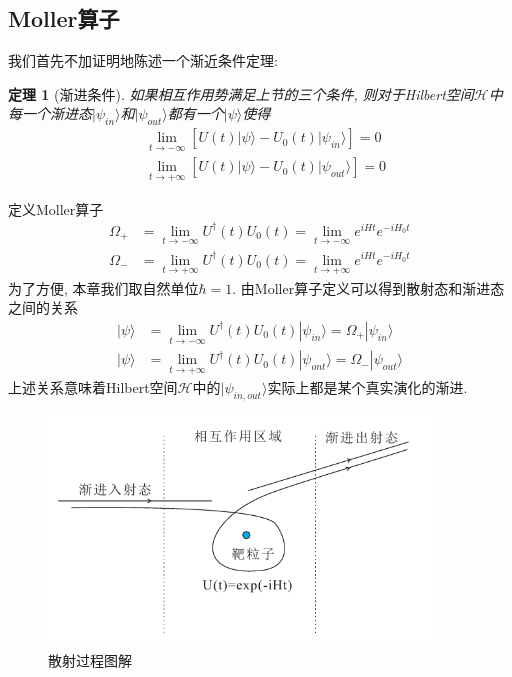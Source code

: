 \documentclass[a4paper,11pt]{book}
\newtheorem{theorem}{\hspace{2em}定理}[section]
\begin{document}
\subsection{Moller算子}
我们首先不加证明地陈述一个渐近条件定理:
\begin{theorem}[渐进条件]
  如果相互作用势满足上节的三个条件, 则对于Hilbert空间$\mathcal{H}$中每一个渐进态$|\psi_{in}\rangle$和$|\psi_{out}\rangle$都有一个$|\psi\rangle$使得
  \begin{equation}
    \begin{split}
       &\lim_{t\to-\infty}[U(t)|\psi\rangle-U_0(t)|\psi_{in}\rangle]=0\\
       &\lim_{t\to+\infty}[U(t)|\psi\rangle-U_0(t)|\psi_{out}\rangle]=0
    \end{split}
  \end{equation}
\end{theorem}
定义Moller算子
\begin{equation}
  \begin{split}
     \Omega_{+}&=\lim_{t\to-\infty}U^\dag(t)U_0(t)=\lim_{t\to-\infty}e^{iHt}e^{-iH_0t}\\
     \Omega_{-}&=\lim_{t\to+\infty}U^\dag(t)U_0(t)=\lim_{t\to+\infty}e^{iHt}e^{-iH_0t}
  \end{split}
\end{equation}
为了方便, 本章我们取自然单位$\hbar=1$. 由Moller算子定义可以得到散射态和渐进态之间的关系
\begin{equation}
  \begin{split}
     |\psi\rangle&=\lim_{t\to-\infty}U^\dag(t)U_0(t)|\psi_{in}\rangle=\Omega_{+}|\psi_{in}\rangle\\
     |\psi\rangle&=\lim_{t\to+\infty}U^\dag(t)U_0(t)|\psi_{ont}\rangle=\Omega_{-}|\psi_{out}\rangle
  \end{split}
\end{equation}
上述关系意味着Hilbert空间$\mathcal{H}$中的$|\psi_{in,out}\rangle$实际上都是某个真实演化的渐进.
\begin{figure}[H]
  \centering
  \includegraphics[width=4in]{fig10.pdf}
  \caption{散射过程图解}
\end{figure}
\end{document}
